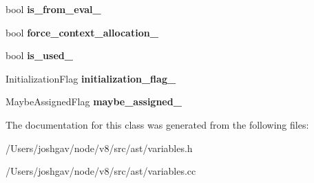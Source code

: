 \begin{DoxyCompactItemize}
\item 
bool {\bfseries is\+\_\+from\+\_\+eval\+\_\+}\hypertarget{classv8_1_1internal_1_1_variable_a4a88edb80c5e7ed4f9bbee1f69f9996a}{}\label{classv8_1_1internal_1_1_variable_a4a88edb80c5e7ed4f9bbee1f69f9996a}

\item 
bool {\bfseries force\+\_\+context\+\_\+allocation\+\_\+}\hypertarget{classv8_1_1internal_1_1_variable_a7b614341d097230a1364ae63806c8e00}{}\label{classv8_1_1internal_1_1_variable_a7b614341d097230a1364ae63806c8e00}

\item 
bool {\bfseries is\+\_\+used\+\_\+}\hypertarget{classv8_1_1internal_1_1_variable_a971e9c520153f8b71c26d470e759e890}{}\label{classv8_1_1internal_1_1_variable_a971e9c520153f8b71c26d470e759e890}

\item 
Initialization\+Flag {\bfseries initialization\+\_\+flag\+\_\+}\hypertarget{classv8_1_1internal_1_1_variable_ad97e3394c27f9b6c1e553c757efd8d65}{}\label{classv8_1_1internal_1_1_variable_ad97e3394c27f9b6c1e553c757efd8d65}

\item 
Maybe\+Assigned\+Flag {\bfseries maybe\+\_\+assigned\+\_\+}\hypertarget{classv8_1_1internal_1_1_variable_a1be06c711c4ff5ac06d2e58ce0fadac8}{}\label{classv8_1_1internal_1_1_variable_a1be06c711c4ff5ac06d2e58ce0fadac8}

\end{DoxyCompactItemize}


The documentation for this class was generated from the following files\+:\begin{DoxyCompactItemize}
\item 
/\+Users/joshgav/node/v8/src/ast/variables.\+h\item 
/\+Users/joshgav/node/v8/src/ast/variables.\+cc\end{DoxyCompactItemize}

